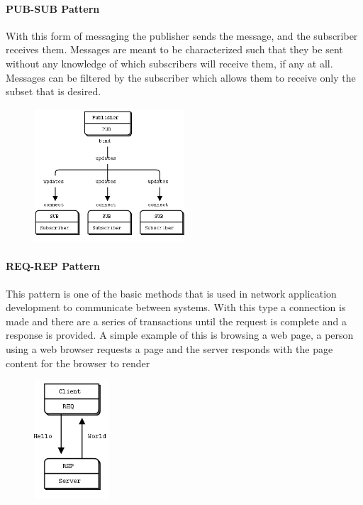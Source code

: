     \paragraph{PUB-SUB Pattern}

      With this form of messaging the publisher sends the message, and the
      subscriber receives them. Messages are meant to be characterized such
      that they be sent without any knowledge of which subscribers will receive
      them, if any at all. Messages can be filtered by the subscriber which
      allows them to receive only the subset that is desired.

      \begin{figure}[H]
        \begin{center}
          \includegraphics[width=0.5\textwidth]{figures/pub-sub-pattern}
        \end{center}
      \end{figure}

    \paragraph{REQ-REP Pattern}

      This pattern is one of the basic methods that is used in network
      application development to communicate between systems. With this type a
      connection is made and there are a series of transactions until the
      request is complete and a response is provided. A simple example of this
      is browsing a web page, a person using a web browser requests a page and
      the server responds with the page content for the browser to render

      \begin{figure}[H]
        \begin{center}
          \includegraphics[width=0.25\textwidth]{figures/req-rep-pattern}
        \end{center}
      \end{figure}

